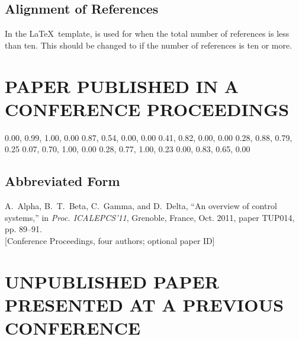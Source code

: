 \documentclass[letterpaper,  %
              ]{jacow-2_3}   %
\begin{document}
\subsection{Alignment of References}

In the \LaTeX\ template, \verb|| is used for
when the total number of references is less than ten. This
should be changed to \verb|| if the number of
references is ten or more.



\patchcmd{}
\section{PAPER PUBLISHED IN A CONFERENCE PROCEEDINGS}

\definecolor{jred}{cmyk}  {0.00, 0.99, 1.00, 0.00}
\definecolor{jblue}{cmyk} {0.87, 0.54, 0.00, 0.00}
\definecolor{jvio}{cmyk}  {0.41, 0.82, 0.00, 0.00}
\definecolor{jbook}{cmyk} {0.28, 0.88, 0.79, 0.25}
\definecolor{jrept}{cmyk} {0.07, 0.70, 1.00, 0.00}
\definecolor{jmanu}{cmyk} {0.28, 0.77, 1.00, 0.23}
\definecolor{junpu}{cmyk} {0.00, 0.83, 0.65, 0.00}


\subsection{Abbreviated Form}

\begin{thebibliography}{9} %

	

	
	
	A.~Alpha, B.~T.~Beta, C.~Gamma, and D.~Delta, 
	“An overview of control systems,”
	in \emph{Proc. ICALEPCS’11}, Grenoble, France, Oct. 2011, 
	paper TUP014, pp. 89--91.\\
	\textcolor{jgreen}{[Conference Proceedings, four authors; optional paper ID]}
\end{thebibliography}


\section{UNPUBLISHED PAPER PRESENTED AT A PREVIOUS CONFERENCE}
\end{document}
